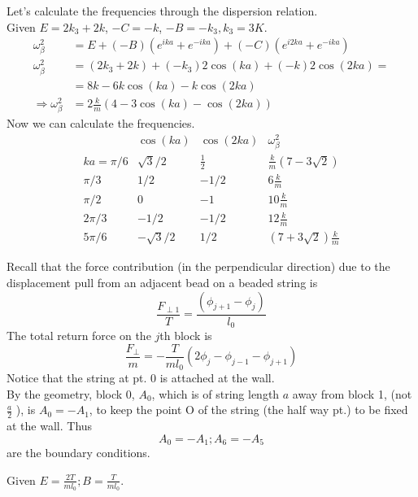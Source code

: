\documentclass[twoside,10pt]{amsart}
\newcommand{\problemhead}[1]
  {\smallskip
   \noindent{\large\bf Problem #1.}
   \smallskip}
\begin{document}
Let's calculate the frequencies through the dispersion relation.  \\
Given $E=2 k_3 + 2k$, $-C = -k$, $-B = -k_3, k_3 = 3K$.  
\[
\begin{aligned}
  \omega_{\beta}^2 & = E + (-B) (e^{ika} + e^{-ika}) + (-C)(e^{i2ka} + e^{-ika})  \\
  \omega_{\beta}^2 & = (2 k_3 + 2 k) + (-k_3)2 \cos{ (ka)} + (-k) 2 \cos{ (2ka)} = \\
 & = 8 k - 6 k \cos{ (ka)} -k \cos{( 2ka)}  \\
  \Longrightarrow \omega^2_{\beta} & = 2 \frac{k}{m} (4 -3 \cos{ (ka)}- \cos{(2ka)} )
\end{aligned}
\]
Now we can calculate the frequencies.  
\[
\begin{matrix}
            &    \cos{(ka)}  & \cos{ (2ka) }   &   \omega_{\beta}^2  \\
ka = \pi/6  & \sqrt{3}/2     & \frac{1}{2}    &  \frac{k}{m} (7-3 \sqrt{2} )    \\
\pi /3  &    1/2             &  -1/2          & 6 \frac{k}{m}   \\
\pi/2   &    0              & -1              & 10 \frac{k}{m}   \\
2\pi/3   &    -1/2          & - 1/2          & 12 \frac{k}{m}  \\
5\pi/6   &    -\sqrt{3}/2          &  1/2          & (7+3\sqrt{2}) \frac{k}{m}
\end{matrix}
\]

\problemhead{5.3}

Recall that the force contribution (in the perpendicular direction) due to the displacement pull from an adjacent bead on a beaded string is
\[
\frac{F_{\perp 1 }}{ T} = \frac{ (\phi_{j+1} - \phi_j ) }{ l_0}
\]
The total return force on the $j$th block is 
\[
\frac{ F_{\perp}}{m} = -\frac{T}{ml_0} (2 \phi_j - \phi_{j-1} - \phi_{j+1} )
\]
Notice that the string at pt. 0 is attached at the wall.  \\
\quad By the geometry, block 0, $A_0$, which is of string length $a$ away from block 1, (not $\frac{a}{2}$ ), is $A_0 = -A_1$, to keep the point O of the string (the half way pt.) to be fixed at the wall.  Thus
\[
A_0 = -A_1 ; A_6 = -A_5
\]
are the boundary conditions.  

Given $E = \frac{2T }{ml_0}; B = \frac{T }{ml_0}$.  
\end{document}
